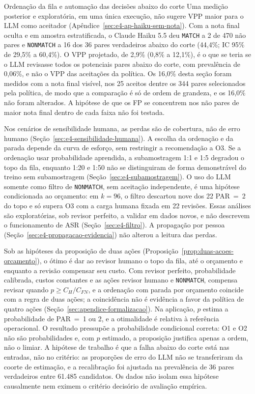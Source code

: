 \begin{chapter}{Ordenação da fila e automação das decisões abaixo do corte}
Uma medição posterior e exploratória, em uma única execução, não sugere VPP maior para o LLM como aceitador (Apêndice~\ref{sec:e4-ap-haiku-sem-nota}). Com a nota final oculta e em amostra estratificada, o Claude Haiku 5.5 deu \texttt{MATCH} a 2 de 470 não pares e \texttt{NONMATCH} a 16 dos 36 pares verdadeiros abaixo do corte (44,4\%; IC 95\% de 29,5\% a 60,4\%). O VPP projetado, de 2,9\% (0,8\% a 12,1\%), é o que se teria se o LLM revisasse todos os potenciais pares abaixo do corte, com prevalência de 0,06\%, e não o VPP das aceitações da política. Os 16,0\% desta seção foram medidos com a nota final visível, nos 25 aceitos dentre os 344 pares selecionados pela política, de modo que a comparação é só de ordem de grandeza, e os 16,0\% não foram alterados. A hipótese de que os FP se concentrem nos não pares de maior nota final dentro de cada faixa não foi testada.

Nos cenários de sensibilidade humana, as perdas são de cobertura, não de erro humano (Seção~\ref{sec:e4-sensibilidade-humana}). A escolha da ordenação e da parada depende da curva de esforço, sem restringir a recomendação a O3. Se a ordenação usar probabilidade aprendida, a subamostragem 1:1 e 1:5 degradou o topo da fila, enquanto 1:20 e 1:50 não se distinguiram de forma demonstrável do treino sem subamostragem (Seção~\ref{sec:e4-subamostragem}). O uso do LLM somente como filtro de \texttt{NONMATCH}, sem aceitação independente, é uma hipótese condicionada ao orçamento: em $k=96$, o filtro descartou nove dos 22 PAR~=~2 do topo e só supera O3 com a carga humana fixada em 22 revisões. Essas análises são exploratórias, sob revisor perfeito, a validar em dados novos, e não descrevem o funcionamento de ASR (Seção~\ref{sec:e4-filtro}). A propagação por pessoa (Seção~\ref{sec:e4-propagacao-evidencia}) não alterou a leitura das perdas.

Sob as hipóteses da proposição de duas ações (Proposição~\ref{prop:duas-acoes-orcamento}), o ótimo é dar ao revisor humano o topo da fila, até o orçamento e enquanto a revisão compensar seu custo. Com revisor perfeito, probabilidade calibrada, custos constantes e as ações revisor humano e \texttt{NONMATCH}, compensa revisar quando $p\geq C_H/C_{FN}$, e a ordenação com parada por orçamento coincide com a regra de duas ações; a coincidência não é evidência a favor da política de quatro ações (Seção~\ref{sec:apendice-formalizacao}). Na aplicação, $p$ estima a probabilidade de PAR~=~1 ou 2, e a otimalidade é relativa à referência operacional. O resultado pressupõe a probabilidade condicional correta: O1 e O2 não são probabilidades e, com $p$ estimado, a proposição justifica apenas a ordem, não o limiar. A hipótese de trabalho é que a falha abaixo do corte está nas entradas, não no critério: as proporções de erro do LLM não se transferiram da coorte de estimação, e a recalibração foi ajustada na prevalência de 36 pares verdadeiros entre 61.485 candidatos. Os dados não isolam essa hipótese causalmente nem eximem o critério decisório de avaliação empírica.


\end{chapter}
